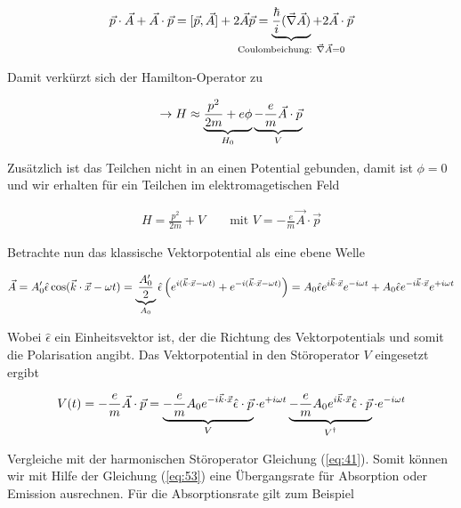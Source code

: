 \begin{align}
  \label{eq:58}
   \vec p \cdot\vec A +  \vec A \cdot\vec p  = [\vec p,\vec A] + 2\vec A\vec p =  \underbr{\frac{\hbar}{i}(\vec \nabla\vec A)}_{\text{Coulombeichung: }\vec \nabla \vec A=0}+ 2\vec A \cdot\vec p 
\end{align}

Damit verkürzt sich der Hamilton-Operator zu

\begin{align}
  \label{eq:55}
  \rightarrow  H \approx \underbr{\frac{p^2}{2m} + e\phi}_{H_0} \underbr{- \frac{e}{m} \vec A\cdot \vec p }_{V}
\end{align}

Zusätzlich ist das Teilchen nicht in an einen Potential gebunden, damit ist \(\phi=0\) und wir erhalten für ein Teilchen im elektromagetischen Feld

\begin{align}
  \label{eq:59}
  H = \frac{p^2}{2m} + V\qquad \text{mit } V = - \frac{e}{m} \vec A\cdot \vec p
\end{align}

Betrachte nun das klassische Vektorpotential als eine ebene Welle

\begin{align}
  \label{eq:60}
  \vec A = A'_0 \hat\epsilon \cos(\vec k\cdot \vec x - \omega t) = \underbr{\frac{A'_0}{2}}_{A_0}\hat\epsilon \left( e^{i(\vec k\cdot \vec x - \omega t) }+ e^{- i(\vec k\cdot \vec x - \omega t) }  \right) =  A_0\hat\epsilon e^{i\vec k\cdot \vec x}e^{ - i\omega t }+  A_0\hat\epsilon e^{- i \vec k\cdot \vec x} e^{ + i \omega t } 
\end{align}

Wobei \(\hat\epsilon\) ein  Einheitsvektor  ist, der die Richtung des Vektorpotentials und somit die Polarisation angibt. Das Vektorpotential in den Störoperator \(V\) eingesetzt ergibt

\begin{align}
  \label{eq:61}
  V(t) = - \frac{e}{m} \vec A\cdot \vec p = \underbr{- \frac{e}{m} A_0 e^{- i \vec k\cdot \vec x} \hat\epsilon\cdot \vec p}_{V} \cdot e^{ + i \omega t } \underbr{- \frac{e}{m}  A_0 e^{i\vec k\cdot \vec x} \hat\epsilon \cdot \vec p }_{V^\dagger} \cdot e^{ - i\omega t }
\end{align}

Vergleiche mit der harmonischen Störoperator Gleichung (\ref{eq:41}). Somit können wir mit Hilfe der Gleichung (\ref{eq:53}) eine Übergangsrate für Absorption oder Emission ausrechnen. Für die Absorptionsrate gilt zum Beispiel

